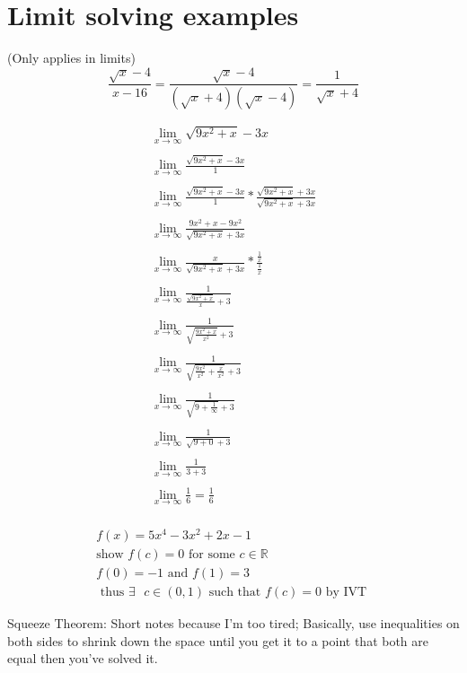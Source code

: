 \documentclass[12pt, english]{article}
\begin{document}
\section{Limit solving examples}
(Only applies in limits)
\begin{equation}
	\frac{\sqrt{x}-4}{x-16} = \frac{\sqrt{x}-4}{(\sqrt{x}+4)(\sqrt{x}-4)} = \frac{1}{\sqrt{x}+4}
\end{equation}

\begin{equation}
	\begin{split}
		\lim_{x \to \infty} \sqrt{9x^2 + x} - 3x \\
		\\
		\lim_{x \to \infty} \frac{\sqrt{9x^2 + x} - 3x}{1} \\
		\\
		\lim_{x \to \infty} \frac{\sqrt{9x^2 + x} - 3x}{1} * \frac{\sqrt{9x^2 + x} + 3x}{\sqrt{9x^2 + x} + 3x} \\
		\\
		\lim_{x \to \infty} \frac{9x^2 + x - 9x^2}{\sqrt{9x^2 + x} + 3x} \\
		\\
		\lim_{x \to \infty} \frac{x}{\sqrt{9x^2 + x} + 3x} * \frac{\frac{1}{x}}{\frac{1}{x}} \\
		\\
		\lim_{x \to \infty} \frac{1}{\frac{\sqrt{9x^2 + x}}{x} + 3} \\
		\\
		\lim_{x \to \infty} \frac{1}{\sqrt{\frac{9x^2 + x}{x^2}} + 3} \\
		\\
		\lim_{x \to \infty} \frac{1}{\sqrt{\frac{9x^2}{x^2} + \frac{x}{x^2}} + 3} \\
		\\
		\lim_{x \to \infty} \frac{1}{\sqrt{9 + \frac{1}{\infty}} + 3} \\
		\\
		\lim_{x \to \infty} \frac{1}{\sqrt{9 + 0} + 3} \\
		\\
		\lim_{x \to \infty} \frac{1}{3 + 3} \\
		\\
		\lim_{x \to \infty} \frac{1}{6} = \frac{1}{6} \\
	\end{split}
\end{equation}

\begin{equation}
	\begin{split}
		f(x) = 5x^4 - 3x^2 + 2x - 1 \\
		\text{show  } f(c) = 0 \text{ for some }
		c \in \mathbb{R} \\
		f(0) = -1 \text{ and } f(1) = 3 \\
		\text{ thus } \exists \text { } c \in (0,1) \text{ such that } f(c) = 0 \text{ by IVT } 
	\end{split}
\end{equation}

	Squeeze Theorem:
	Short notes because I'm too tired; Basically, use inequalities on both sides to 
	shrink down the space until you get it to a point that both are equal then you've solved it.
\end{document}
